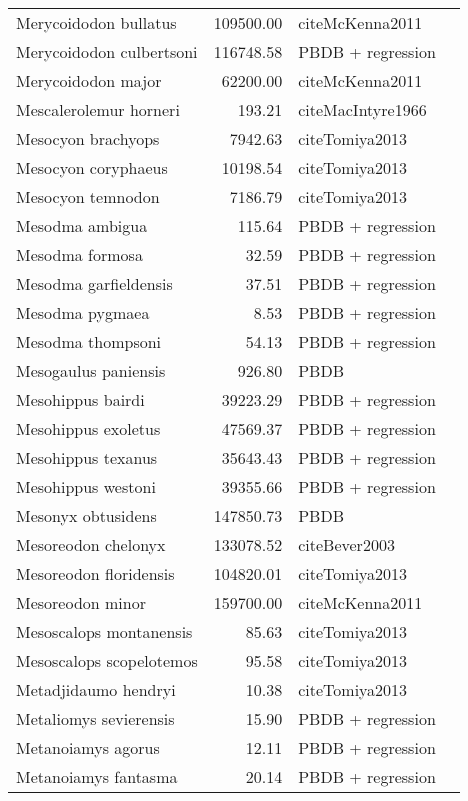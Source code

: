 \begin{table}[ht]
\begin{tabular}{lrll}
  Merycoidodon bullatus & 109500.00 & cite{McKenna2011} &  \\ 
  Merycoidodon culbertsoni & 116748.58 & PBDB + regression &  \\ 
  Merycoidodon major & 62200.00 & cite{McKenna2011} &  \\ 
  Mescalerolemur horneri & 193.21 & cite{MacIntyre1966} &  \\ 
  Mesocyon brachyops & 7942.63 & cite{Tomiya2013} &  \\ 
  Mesocyon coryphaeus & 10198.54 & cite{Tomiya2013} &  \\ 
  Mesocyon temnodon & 7186.79 & cite{Tomiya2013} &  \\ 
  Mesodma ambigua & 115.64 & PBDB + regression &  \\ 
  Mesodma formosa & 32.59 & PBDB + regression &  \\ 
  Mesodma garfieldensis & 37.51 & PBDB + regression &  \\ 
  Mesodma pygmaea & 8.53 & PBDB + regression &  \\ 
  Mesodma thompsoni & 54.13 & PBDB + regression &  \\ 
  Mesogaulus paniensis & 926.80 & PBDB &  \\ 
  Mesohippus bairdi & 39223.29 & PBDB + regression &  \\ 
  Mesohippus exoletus & 47569.37 & PBDB + regression &  \\ 
  Mesohippus texanus & 35643.43 & PBDB + regression &  \\ 
  Mesohippus westoni & 39355.66 & PBDB + regression &  \\ 
  Mesonyx obtusidens & 147850.73 & PBDB &  \\ 
  Mesoreodon chelonyx & 133078.52 & cite{Bever2003} &  \\ 
  Mesoreodon floridensis & 104820.01 & cite{Tomiya2013} &  \\ 
  Mesoreodon minor & 159700.00 & cite{McKenna2011} &  \\ 
  Mesoscalops montanensis & 85.63 & cite{Tomiya2013} &  \\ 
  Mesoscalops scopelotemos & 95.58 & cite{Tomiya2013} &  \\ 
  Metadjidaumo hendryi & 10.38 & cite{Tomiya2013} &  \\ 
  Metaliomys sevierensis & 15.90 & PBDB + regression &  \\ 
  Metanoiamys agorus & 12.11 & PBDB + regression &  \\ 
  Metanoiamys fantasma & 20.14 & PBDB + regression &  \\ 

\end{tabular}
\end{table}

